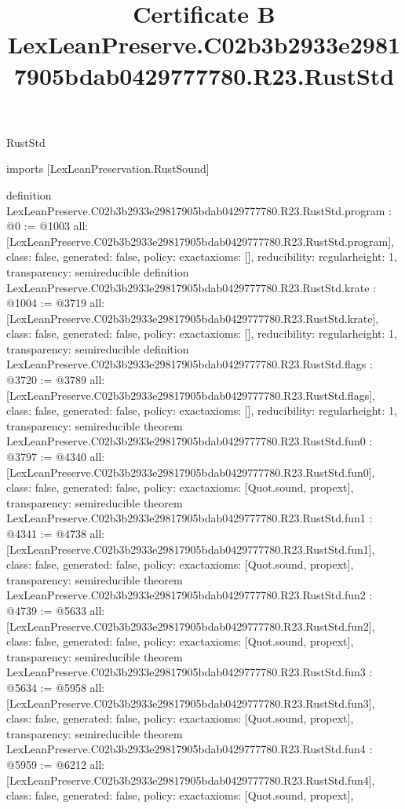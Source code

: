 \begin{lexlean}{RustStd}
\title{Certificate B LexLeanPreserve.C02b3b2933e29817905bdab0429777780.R23.RustStd}
\begin{coremodule}
imports [LexLeanPreservation.RustSound]

definition LexLeanPreserve.C02b3b2933e29817905bdab0429777780.R23.RustStd.program : @0 := @1003 {
  all: [LexLeanPreserve.C02b3b2933e29817905bdab0429777780.R23.RustStd.program],
  class: false,
  generated: false,
  policy: exact{axioms: []},
  reducibility: regular{height: 1},
  transparency: semireducible
}
definition LexLeanPreserve.C02b3b2933e29817905bdab0429777780.R23.RustStd.krate : @1004 := @3719 {
  all: [LexLeanPreserve.C02b3b2933e29817905bdab0429777780.R23.RustStd.krate],
  class: false,
  generated: false,
  policy: exact{axioms: []},
  reducibility: regular{height: 1},
  transparency: semireducible
}
definition LexLeanPreserve.C02b3b2933e29817905bdab0429777780.R23.RustStd.flags : @3720 := @3789 {
  all: [LexLeanPreserve.C02b3b2933e29817905bdab0429777780.R23.RustStd.flags],
  class: false,
  generated: false,
  policy: exact{axioms: []},
  reducibility: regular{height: 1},
  transparency: semireducible
}
theorem LexLeanPreserve.C02b3b2933e29817905bdab0429777780.R23.RustStd.fun0 : @3797 := @4340 {
  all: [LexLeanPreserve.C02b3b2933e29817905bdab0429777780.R23.RustStd.fun0],
  class: false,
  generated: false,
  policy: exact{axioms: [Quot.sound, propext]},
  transparency: semireducible
}
theorem LexLeanPreserve.C02b3b2933e29817905bdab0429777780.R23.RustStd.fun1 : @4341 := @4738 {
  all: [LexLeanPreserve.C02b3b2933e29817905bdab0429777780.R23.RustStd.fun1],
  class: false,
  generated: false,
  policy: exact{axioms: [Quot.sound, propext]},
  transparency: semireducible
}
theorem LexLeanPreserve.C02b3b2933e29817905bdab0429777780.R23.RustStd.fun2 : @4739 := @5633 {
  all: [LexLeanPreserve.C02b3b2933e29817905bdab0429777780.R23.RustStd.fun2],
  class: false,
  generated: false,
  policy: exact{axioms: [Quot.sound, propext]},
  transparency: semireducible
}
theorem LexLeanPreserve.C02b3b2933e29817905bdab0429777780.R23.RustStd.fun3 : @5634 := @5958 {
  all: [LexLeanPreserve.C02b3b2933e29817905bdab0429777780.R23.RustStd.fun3],
  class: false,
  generated: false,
  policy: exact{axioms: [Quot.sound, propext]},
  transparency: semireducible
}
theorem LexLeanPreserve.C02b3b2933e29817905bdab0429777780.R23.RustStd.fun4 : @5959 := @6212 {
  all: [LexLeanPreserve.C02b3b2933e29817905bdab0429777780.R23.RustStd.fun4],
  class: false,
  generated: false,
  policy: exact{axioms: [Quot.sound, propext]},
}
\end{coremodule}
\end{lexlean}

